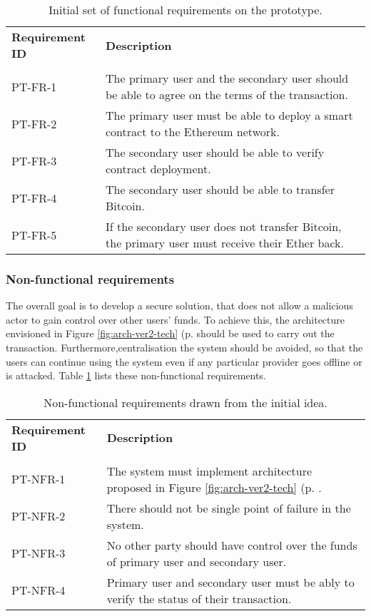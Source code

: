 \begin{table}[ht]
    \centering
    \begin{tabularx}{\textwidth}{|l X|}
    \hline
    \textbf{Requirement ID}& \textbf{Description}\\
    &\\
    PT-FR-1 & The primary user and the secondary user should be able to agree on the terms of the transaction.\\
    PT-FR-2 & The primary user must be able to deploy a smart contract to the Ethereum network.\\
    PT-FR-3 & The secondary user should be able to verify contract deployment.\\
    PT-FR-4 & The secondary user should be able to transfer Bitcoin.\\
    PT-FR-5 & If the secondary user does not transfer Bitcoin, the primary user must receive their Ether back.\\
    \hline
    \end{tabularx}
    \caption{Initial set of functional requirements on the prototype.}
    \label{tab:pt-func-reqs}
    \end{table}

% 
\subsubsection{Non-functional requirements}
The overall goal is to develop a secure solution, that does not allow a malicious actor to gain control over other users' funds. To achieve this, the architecture envisioned in Figure \ref{fig:arch-ver2-tech} (p. \pageref{fig:arch-ver2-tech} should be used to carry out the transaction. Furthermore,centralisation the system should be avoided, so that the users can continue using the system even if any particular provider goes offline or is attacked. Table \ref{tab:pt-func-reqs} lists these non-functional requirements.

\begin{table}[ht]
    \centering
    \begin{tabularx}{\textwidth}{|l X|}
    \hline
    \textbf{Requirement ID}&\textbf{Description}\\
    &\\
    PT-NFR-1&The system must implement architecture proposed in Figure \ref{fig:arch-ver2-tech} (p. \pageref{fig:arch-ver2-tech}.\\
    PT-NFR-2&There should not be single point of failure in the system.\\
    PT-NFR-3&No other party should have control over the funds of primary user and secondary user.\\
    PT-NFR-4&Primary user and secondary user must be ably to verify the status of their transaction.\\
    \hline
    \end{tabularx}
    
    \caption{Non-functional requirements drawn from the initial idea.}
    \label{tab:pt-nonfunc-reqs}
\end{table}

